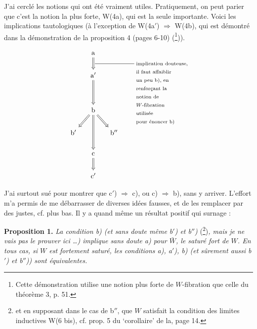 \documentclass[11pt]{article}
\newcommand{\printedpage}[1]{\marginpar{\footnotesize p.~#1}}
\newcommand{\msp}[1]{\marginpar{\footnotesize [#1]}}
\begin{document}
\msp{page 54}

J'ai cerclé les notions qui ont été vraiment utiles. Pratiquement, on peut parier que c'est la notion la plus forte, W(4a), qui est la seule importante. Voici les implications tautologiques (à l'exception de W(4a$'$) $\Longrightarrow$ W(4b), qui est démontré dans la démonstration de la proposition 4 (pages 6-10) (\footnote[61]{Cette démonstration utilise une notion plus forte de $W$-fibration que celle du théorème 3, p. 51.})).

\printedpage{40}

\[
\begin{tikzcd}[column sep=small]
& \mathrm{a} \arrow[d,Rightarrow] & \\
& \mathrm{a}' \arrow[dd,Rightarrow,"{\text{\rule[0.6ex]{2cm}{0.4pt}\ \begin{tabular}[t]{@{}l@{}}implication douteuse,\\ il faut affaiblir\\ un peu b), en\\ renforçant la\\ notion de\\ $W$-fibration\\ utilisée\\ pour énoncer b)\end{tabular}}}"] & \\
& & \\
& \mathrm{b} \arrow[dl,Rightarrow] \arrow[dr,Rightarrow] \arrow[dd,Rightarrow] & \\
\mathrm{b}' & & \mathrm{b}'' \\
& \mathrm{c} \arrow[d,Rightarrow] & \\
& \mathrm{c}' &
\end{tikzcd}
\]

J'ai surtout sué pour montrer que c$'$) $\Longrightarrow$ c), ou c) $\Longrightarrow$ b), sans y arriver. L'effort m'a permis de me débarrasser de diverses idées fausses, et de les remplacer par des justes, cf. plus bas. Il y a quand même un résultat positif qui surnage :

\textbf{Proposition 1.} \textit{La condition b) (et sans doute même b$'$) et b$''$)} (\footnote[62]{et en supposant dans le cas de b$''$, que $W$ satisfait la condition des limites inductives W(6 bis), cf. prop. 5 du `corollaire' de la, page 14.})\textit{, mais je ne vais pas le prouver ici \dots) implique sans doute a) pour $\bar{W}$, le saturé fort de $W$. En tous cas, si $W$ est fortement saturé, les conditions a), a$'$), b) (et sûrement aussi b$'$) et b$''$)) sont équivalentes.}
\end{document}
